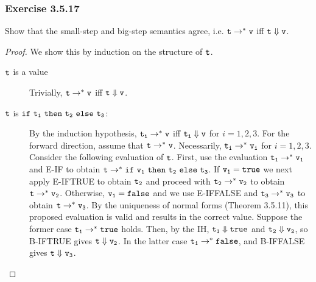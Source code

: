 \subsubsection*{Exercise 3.5.17}
Show that the small-step and big-step semantics agree, i.e. $\mathtt{t} \rightarrow^* \mathtt{v}$ iff 
$\mathtt{t} \Downarrow \mathtt{v}$.

\begin{proof} We show this by induction on the structure of $\mathtt{t}$.
    \begin{description}
    \item[$\mathtt{t}$ is a value] Trivially, $\mathtt{t} \rightarrow^* \mathtt{v}$ iff $\mathtt{t} \Downarrow \mathtt{v}$.
    \item[$\mathtt{t}$ is $\mathtt{if}\,\,\mathtt{\mathtt{t_1}}\,\,\mathtt{then}\,\,\mathtt{\mathtt{t_2}}\,\,\mathtt{else}\,\,\mathtt{\mathtt{t_3}}$:] By the induction hypothesis,
        $\mathtt{t_i} \rightarrow^* \mathtt{v}$ iff $\mathtt{t_i} \Downarrow \mathtt{v}$ for $i = 1, 2, 3$.
        For the forward direction, assume that $\mathtt{t} \rightarrow^* \mathtt{v}$.  Necessarily,
        $\mathtt{t_i} \rightarrow^* \mathtt{v_i}$ for $i = 1, 2, 3$.  Consider the following evaluation of
        $\mathtt{t}$.  First, use the evaluation $\mathtt{t_1} \rightarrow^* \mathtt{v_1}$ and E-IF to obtain 
        $\mathtt{t} \rightarrow^* \mathtt{if}\,\,\mathtt{\mathtt{v_1}}\,\,\mathtt{then}\,\,\mathtt{\mathtt{t_2}}\,\,\mathtt{else}\,\,\mathtt{\mathtt{t_3}}$.  If $\mathtt{v_1} = \mathtt{true}$ we 
        next apply E-IFTRUE to obtain $\mathtt{t_2}$ and proceed with $\mathtt{t_2} \rightarrow^* \mathtt{v_2}$ to obtain
        $\mathtt{t} \rightarrow^* \mathtt{v_2}$.  Otherwise, $\mathtt{v_1} = \mathtt{false}$ and we use E-IFFALSE and 
        $\mathtt{t_3} \rightarrow^* \mathtt{v_3}$ to obtain $\mathtt{t} \rightarrow^* {\mathtt{v_3}}$.
        By the uniqueness of normal forms (Theorem 3.5.11), this proposed evaluation is valid and
        results in the correct value. Suppose the former case $\mathtt{t_1} \rightarrow^* \mathtt{true}$ holds.  Then, 
        by the IH, $\mathtt{t_1} \Downarrow \mathtt{true}$ and $\mathtt{t_2} \Downarrow \mathtt{v_2}$, so
        B-IFTRUE gives $\mathtt{t} \Downarrow \mathtt{v_2}$.  In the latter case $\mathtt{t_1} \rightarrow^* \mathtt{false}$,
        and B-IFFALSE gives $\mathtt{t} \Downarrow \mathtt{v_3}$.


\end{description}
\end{proof}
